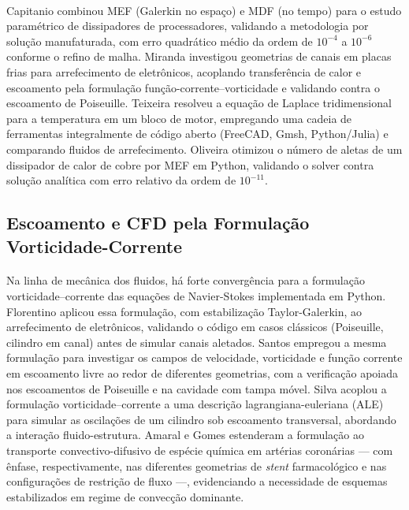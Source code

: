 \paragraph{}Capitanio \cite{Capitanio2023} combinou MEF (Galerkin no espaço) e MDF (no tempo) para o estudo paramétrico de dissipadores de processadores, validando a metodologia por solução manufaturada, com erro quadrático médio da ordem de $10^{-4}$ a $10^{-6}$ conforme o refino de malha. Miranda \cite{Miranda2023} investigou geometrias de canais em placas frias para arrefecimento de eletrônicos, acoplando transferência de calor e escoamento pela formulação função-corrente--vorticidade e validando contra o escoamento de Poiseuille. Teixeira \cite{Teixeira2023} resolveu a equação de Laplace tridimensional para a temperatura em um bloco de motor, empregando uma cadeia de ferramentas integralmente de código aberto (FreeCAD, Gmsh, Python/Julia) e comparando fluidos de arrefecimento. Oliveira \cite{Oliveira2025} otimizou o número de aletas de um dissipador de calor de cobre por MEF em Python, validando o solver contra solução analítica com erro relativo da ordem de $10^{-11}$.

\subsection{Escoamento e CFD pela Formulação Vorticidade-Corrente}

\paragraph{}Na linha de mecânica dos fluidos, há forte convergência para a formulação vorticidade--corrente das equações de Navier-Stokes implementada em Python. Florentino \cite{Florentino2022} aplicou essa formulação, com estabilização Taylor-Galerkin, ao arrefecimento de eletrônicos, validando o código em casos clássicos (Poiseuille, cilindro em canal) antes de simular canais aletados. Santos \cite{Santos2022} empregou a mesma formulação para investigar os campos de velocidade, vorticidade e função corrente em escoamento livre ao redor de diferentes geometrias, com a verificação apoiada nos escoamentos de Poiseuille e na cavidade com tampa móvel. Silva \cite{SilvaJessica2020} acoplou a formulação vorticidade--corrente a uma descrição lagrangiana-euleriana (ALE) para simular as oscilações de um cilindro sob escoamento transversal, abordando a interação fluido-estrutura. Amaral \cite{Amaral2020} e Gomes \cite{GomesMatheus2021} estenderam a formulação ao transporte convectivo-difusivo de espécie química em artérias coronárias --- com ênfase, respectivamente, nas diferentes geometrias de \textit{stent} farmacológico e nas configurações de restrição de fluxo ---, evidenciando a necessidade de esquemas estabilizados em regime de convecção dominante.


